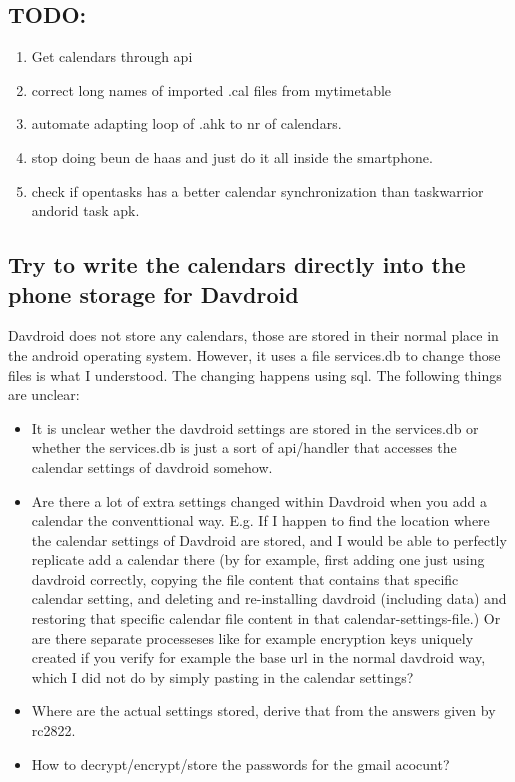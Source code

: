 \subsection{TODO:}
\begin{enumerate}
    \item Get calendars through api
    \item correct long names of imported .cal files from mytimetable
    \item automate adapting loop of .ahk to nr of calendars.
    \item stop doing beun de haas and just do it all inside the smartphone.
    \item check if opentasks has a better calendar synchronization than taskwarrior andorid task apk.
\end{enumerate}
\subsection{Try to write the calendars directly into the phone storage for Davdroid}
Davdroid does not store any calendars, those are stored in their normal place in the android operating system. However, it uses a file services.db to change those files is what I understood. The changing happens using sql. The following things are unclear:
\begin{itemize}
    \item It is unclear wether the davdroid settings are stored in the services.db or whether the services.db is just a sort of api/handler that accesses the calendar settings of davdroid somehow.
    \item Are there a lot of extra settings changed within Davdroid when you add a calendar the conventtional way. E.g. If I happen to find the location where the calendar settings of Davdroid are stored, and I would be able to perfectly replicate add a calendar there (by for example, first adding one just using davdroid correctly, copying the file content that contains that specific calendar setting, and deleting and re-installing davdroid (including data) and restoring that specific calendar file content in that calendar-settings-file.) Or are there separate processeses like for example encryption keys uniquely created if you verify for example the base url in the normal davdroid way, which I did not do by simply pasting in the calendar settings?
    \item Where are the actual settings stored, derive that from the answers given by rc2822.
    \item How to decrypt/encrypt/store the passwords for the gmail acocunt?
\end{itemize}
